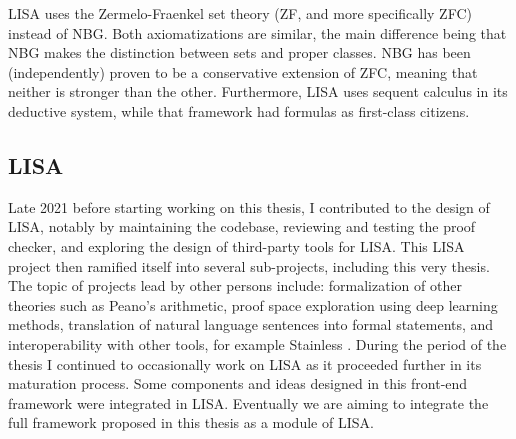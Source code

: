 LISA uses the Zermelo-Fraenkel set theory (ZF, and more specifically ZFC) instead of NBG. Both axiomatizations are similar, the main difference being that NBG makes the distinction between sets and proper classes. NBG has been (independently) proven to be a conservative extension of ZFC, meaning that neither is stronger than the other. Furthermore, LISA uses sequent calculus in its deductive system, while that framework had formulas as first-class citizens.

\subsection{LISA}

Late 2021 before starting working on this thesis, I contributed to the design of LISA, notably by maintaining the codebase, reviewing and testing the proof checker, and exploring the design of third-party tools for LISA. This LISA project then ramified itself into several sub-projects, including this very thesis. The topic of projects lead by other persons include: formalization of other theories such as Peano's arithmetic, proof space exploration using deep learning methods, translation of natural language sentences into formal statements, and interoperability with other tools, for example Stainless \cite{Kuncak2021}. During the period of the thesis I continued to occasionally work on LISA as it proceeded further in its maturation process. Some components and ideas designed in this front-end framework were integrated in LISA. Eventually we are aiming to integrate the full framework proposed in this thesis as a module of LISA.
